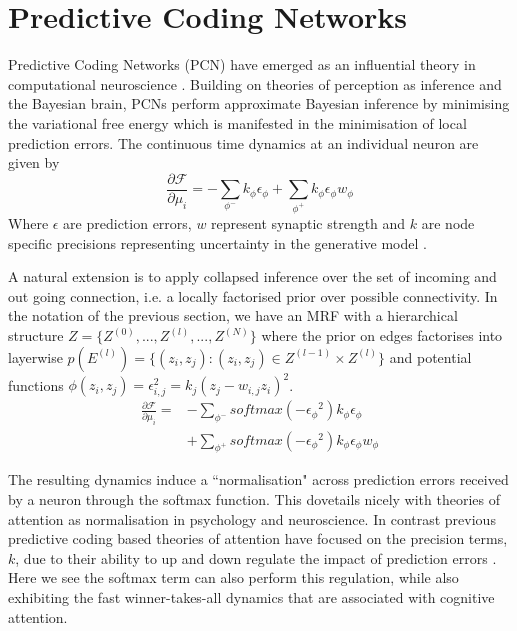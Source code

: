 \documentclass{article}
\theoremstyle{plain}
\theoremstyle{definition}
\theoremstyle{remark}
\begin{document}
\section{Predictive Coding Networks}

Predictive Coding Networks (PCN) have emerged as an influential theory in computational neuroscience \cite{rao_predictive_1999, friston_predictive_2009, buckley_free_2017}. Building on theories of perception as inference and the Bayesian brain, PCNs perform approximate Bayesian inference by minimising the variational free energy which is manifested in the minimisation of local prediction errors. The continuous time dynamics at an individual neuron are given by
$$
    \frac{\partial \mathcal{F}}{\partial \mu_i} = -\sum_{\phi^{-}} k_{\phi}\epsilon_{\phi} + \sum_{\phi^{+}}k_{\phi}\epsilon_{\phi}w_{\phi}
$$
Where $\epsilon$ are prediction errors, $w$ represent synaptic strength and $k$ are node specific precisions representing uncertainty in the generative model \cite{millidge_theoretical_2022}.

A natural extension is to apply collapsed inference over the set of incoming and out going connection, i.e. a locally factorised prior over possible connectivity. In the notation of the previous section, we have an MRF with a hierarchical structure $Z = \{Z^{(0)}, ..., Z^{(l)}, ..., Z^{(N)} \}$ where the prior on edges factorises into layerwise $p(E^{(l)})=\{(z_i, z_j): (z_i, z_j) \in Z^{(l-1)}\times Z^{(l)}\}$ and potential functions $\phi(z_i, z_j)=\epsilon_{i,j}^2 = k_{j}(z_j - w_{i,j}z_i)^2$.
\begin{equation*}
    \begin{split}
          \frac{\partial \mathcal{F}}{\partial \mu_i} =  &-\sum_{\phi^{-}} softmax( {-\epsilon_\phi}^2)k_{\phi}\epsilon_{\phi} \\
                    & + \sum_{\phi^{+}} softmax( {-\epsilon_\phi}^2)k_{\phi}\epsilon_{\phi}w_{\phi}
    \end{split}
\end{equation*}

The resulting dynamics induce a ``normalisation" across prediction errors received by a neuron through the softmax function. This dovetails nicely with theories of attention as normalisation in psychology and neuroscience. In contrast previous predictive coding based theories of attention have focused on the precision terms, $k$, due to their ability to up and down regulate the impact of prediction errors \cite{feldman_attention_2010}. Here we see the softmax term can also perform this regulation, while also exhibiting the fast winner-takes-all dynamics that are associated with cognitive attention.
\end{document}
